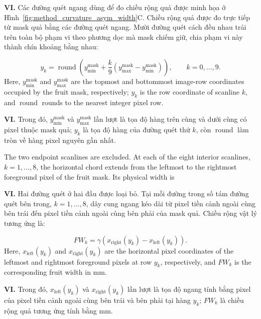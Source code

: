 \documentclass[final,1p,11pt,longtitle]{elsarticle}
\newenvironment{viet}{\par\smallskip\begingroup\color{viColor}\noindent\textbf{VI. }\ignorespaces}{\par\endgroup\smallskip}
\begin{document}
\begin{viet}
Các đường quét ngang dùng để đo chiều rộng quả được minh họa ở Hình~\ref{fig:method_curvature_asym_width}C. Chiều rộng quả được đo trực tiếp từ mask quả bằng các đường quét ngang. Mười đường quét cách đều nhau trải trên toàn bộ phạm vi theo phương dọc mà mask chiếm giữ, chia phạm vi này thành chín khoảng bằng nhau:
\end{viet}

\begin{equation}
    y_k = \operatorname{round}\left(
    y_{\min}^{\mathrm{mask}} +
    \frac{k}{9}\left(y_{\max}^{\mathrm{mask}}-y_{\min}^{\mathrm{mask}}\right)
    \right), \qquad k=0,\ldots,9.
\end{equation}
Here, $y_{\min}^{\mathrm{mask}}$ and $y_{\max}^{\mathrm{mask}}$ are the topmost and bottommost image-row coordinates occupied by the fruit mask, respectively; $y_k$ is the row coordinate of scanline $k$, and $\operatorname{round}$ rounds to the nearest integer pixel row.

\begin{viet}
Trong đó, $y_{\min}^{\mathrm{mask}}$ và $y_{\max}^{\mathrm{mask}}$ lần lượt là tọa độ hàng trên cùng và dưới cùng có pixel thuộc mask quả; $y_k$ là tọa độ hàng của đường quét thứ $k$, còn $\operatorname{round}$ làm tròn về hàng pixel nguyên gần nhất.
\end{viet}

The two endpoint scanlines are excluded. At each of the eight interior
scanlines, $k=1,\ldots,8$, the horizontal chord extends from the leftmost
to the rightmost foreground pixel of the fruit mask. Its physical width is

\begin{viet}
Hai đường quét ở hai đầu được loại bỏ. Tại mỗi đường trong số tám đường quét bên trong, $k=1,\ldots,8$, dây cung ngang kéo dài từ pixel tiền cảnh ngoài cùng bên trái đến pixel tiền cảnh ngoài cùng bên phải của mask quả. Chiều rộng vật lý tương ứng là:
\end{viet}

\begin{equation}
    FW_k = \gamma\left(x_{\mathrm{right}}(y_k)
    - x_{\mathrm{left}}(y_k)\right).
\end{equation}
Here, $x_{\mathrm{left}}(y_k)$ and $x_{\mathrm{right}}(y_k)$ are the horizontal pixel coordinates of the leftmost and rightmost foreground pixels at row $y_k$, respectively, and $FW_k$ is the corresponding fruit width in mm.

\begin{viet}
Trong đó, $x_{\mathrm{left}}(y_k)$ và $x_{\mathrm{right}}(y_k)$ lần lượt là tọa độ ngang tính bằng pixel của pixel tiền cảnh ngoài cùng bên trái và bên phải tại hàng $y_k$; $FW_k$ là chiều rộng quả tương ứng tính bằng mm.
\end{viet}
\end{document}
